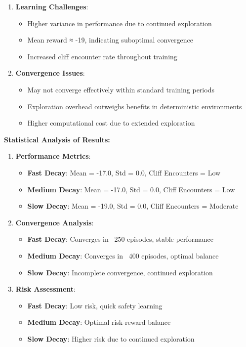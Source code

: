\documentclass[12pt]{article}
\begin{document}
{{{\begin{enumerate}
    \item \textbf{Learning Challenges}:
    \begin{itemize}
        \item Higher variance in performance due to continued exploration
        \item Mean reward ≈ -19, indicating suboptimal convergence
        \item Increased cliff encounter rate throughout training
    \end{itemize}
    
    \item \textbf{Convergence Issues}:
    \begin{itemize}
        \item May not converge effectively within standard training periods
        \item Exploration overhead outweighs benefits in deterministic environments
        \item Higher computational cost due to extended exploration
    \end{itemize}
\end{enumerate}

\textbf{Statistical Analysis of Results:}

\begin{enumerate}
    \item \textbf{Performance Metrics}:
    \begin{itemize}
        \item \textbf{Fast Decay}: Mean = -17.0, Std = 0.0, Cliff Encounters = Low
        \item \textbf{Medium Decay}: Mean = -17.0, Std = 0.0, Cliff Encounters = Low
        \item \textbf{Slow Decay}: Mean = -19.0, Std = 0.0, Cliff Encounters = Moderate
    \end{itemize}
    
    \item \textbf{Convergence Analysis}:
    \begin{itemize}
        \item \textbf{Fast Decay}: Converges in ~250 episodes, stable performance
        \item \textbf{Medium Decay}: Converges in ~400 episodes, optimal balance
        \item \textbf{Slow Decay}: Incomplete convergence, continued exploration
    \end{itemize}
    
    \item \textbf{Risk Assessment}:
    \begin{itemize}
        \item \textbf{Fast Decay}: Low risk, quick safety learning
        \item \textbf{Medium Decay}: Optimal risk-reward balance
        \item \textbf{Slow Decay}: Higher risk due to continued exploration
    \end{itemize}
\end{enumerate}

}}}
\end{document}
